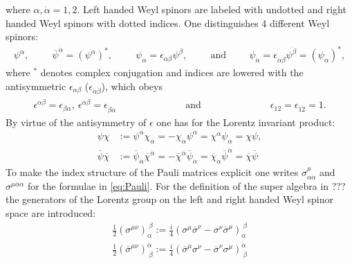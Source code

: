 where $\alpha,\dot{\alpha} = 1,2$. Left handed Weyl spinors are labeled with undotted and right handed Weyl spinors with dotted indices. One distinguishes 4 different Weyl spinors:
\begin{align}
\psi^\alpha, \hspace{1cm} 
\overline{\psi}^{\dot{\alpha}} = (\psi^\alpha)^\ast, \hspace{1cm} \psi_\alpha = \epsilon_{\alpha\beta}\psi^\beta, \hspace{1cm} \mathrm{and} \hspace{1cm} \psi_{\dot{\alpha}} = \epsilon_{\dot{\alpha}\dot{\beta}}\psi^{\dot{\beta}} = (\psi_\alpha)^\ast,
\end{align}
where $^\ast$ denotes complex conjugation and indices are lowered with the antisymmetric $\epsilon_{\alpha\beta}$ ($\epsilon_{\dot{\alpha}\dot{\beta}}$), which obeys
\begin{align}
\epsilon^{\alpha\beta} = \epsilon_{\beta\alpha},\ \epsilon^{\dot{\alpha}\dot{\beta}} = \epsilon_{\dot{\beta}\dot{\alpha}} \hspace{3cm} \mathrm{and} \hspace{3cm} \epsilon_{12} = \epsilon_{\dot{1}\dot{2}}= 1.
\end{align}
By virtue of the antisymmetry of $\epsilon$ one has for the Lorentz invariant product:
\begin{align}
\psi\chi &:= \psi^\alpha\chi_\alpha = -\chi_\alpha\psi^\alpha = \chi^\alpha\psi_\alpha = \chi\psi,\nonumber\\
\overline{\psi}\overline{\chi} &:= \overline{\psi}_{\dot{\alpha}} \overline{\chi}^{\dot{\alpha}} = -\overline{\chi}^{\dot{\alpha}}\overline{\psi}_{\dot{\alpha}} = \overline{\chi}_{\dot{\alpha}}\overline{\psi}^{\dot{\alpha}} = \overline{\chi}\overline{\psi} \label{eq:Weylspinorproduct}
\end{align}
To make the index structure of the Pauli matrices explicit one writes $\sigma^\mu_{\alpha\dot{\alpha}}$ and $\sigma^{\mu\dot{\alpha}\alpha}$ for the formulae in \ref{eq:Pauli}. For the definition of the super algebra in ??? the generators of the Lorentz group on the left and right handed Weyl spinor space are introduced:
\begin{align}
\frac{1}{2}(\sigma^{\mu\nu})_\alpha^{\ \beta} := \frac{i}{4}(\sigma^\mu\overline{\sigma}^\nu - \sigma^\nu\overline{\sigma}^\mu)_\alpha^{\ \beta}\nonumber\\
\frac{1}{2}(\overline{\sigma}^{\mu\nu})^{\dot{\alpha}}_{\ \dot{\beta}} := \frac{i}{4}(\overline{\sigma}^\mu\sigma^\nu - \overline{\sigma}^\nu\sigma^\mu)^{\dot{\alpha}}_{\ \dot{\beta}}
\end{align}

